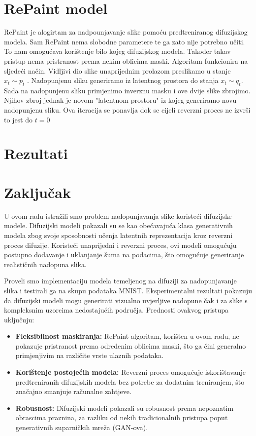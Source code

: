 \documentclass[10pt, a4paper, croatian]{article}
\begin{document}
\section{RePaint model}
RePaint je alogirtam za nadpounjavanje slike pomoću predtreniranog difuzijskog modela. Sam RePaint nema slobodne parametere te ga zato nije
potrebno učiti. To nam omogućava korištenje bilo kojeg difuzijskog modela. Također takav pristup nema pristranost prema nekim oblicima maski. 
Algoritam funkcionira na sljedeći način. Vidljivi dio slike unaprijednim prolazom preslikamo u stanje $x_t \sim p_t$ . Nadopunjenu sliku 
generiramo iz latentnog prostora do stanja $x_t \sim q_t$. Sada na nadopunjenu sliku primjenimo inverznu masku i ove dvije slike zbrojimo. 
Njihov zbroj jednak je novom "latentnom prostoru" iz kojeg generiramo novu nadopunjenu sliku. Ova iteracija se ponavlja dok se cijeli reverzni
proces ne izvrši to jest do $t = 0$

\section{Rezultati}

\section{Zaključak}

U ovom radu istražili smo problem nadopunjavanja slike koristeći difuzijske modele. Difuzijski modeli pokazali su se kao obećavajuća klasa generativnih modela zbog svoje sposobnosti učenja latentnih reprezentacija kroz reverzni proces difuzije. Koristeći unaprijedni i reverzni proces, ovi modeli omogućuju postupno dodavanje i uklanjanje šuma na podacima, što omogućuje generiranje realističnih nadopuna slika.

Proveli smo implementaciju modela temeljenog na difuziji za nadopunjavanje slika i testirali ga na skupu podataka MNIST. Eksperimentalni rezultati pokazuju da difuzijski modeli mogu generirati vizualno uvjerljive nadopune čak i za slike s kompleksnim uzorcima nedostajućih područja. Prednosti ovakvog pristupa uključuju:

\begin{itemize}
    \item \textbf{Fleksibilnost maskiranja:} RePaint algoritam, korišten u ovom radu, ne pokazuje pristranost prema određenim oblicima maski, što ga čini generalno primjenjivim na različite vrste ulaznih podataka.
    \item \textbf{Korištenje postojećih modela:} Reverzni proces omogućuje iskorištavanje predtreniranih difuzijskih modela bez potrebe za dodatnim treniranjem, što značajno smanjuje računalne zahtjeve.
    \item \textbf{Robusnost:} Difuzijski modeli pokazali su robusnost prema nepoznatim obrascima praznina, za razliku od nekih tradicionalnih pristupa poput generativnih suparničkih mreža (GAN-ova).
\end{itemize}
\end{document}
